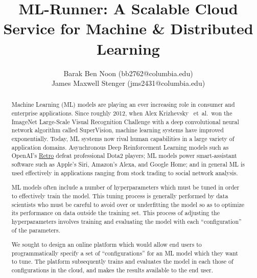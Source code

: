 \documentclass[12pt,oneside]{amsart}
\title{ML-Runner: A Scalable Cloud Service for Machine \& Distributed Learning} %
\author{
    Barak Ben Noon (bb2762@columbia.edu) \\
    James Maxwell Stenger (jms2431@columbia.edu)
}
\newcommand{\etal}{\mbox{ et al. }}
\begin{document}
\pagecolor{pagecolor}

\begin{abstract}
Machine Learning (ML) models are playing an ever increasing role in consumer and enterprise applications.
Since roughly 2012, when Alex Krizhevsky \etal won the ImageNet Large-Scale Visual Recognition Challenge with a deep convolutional neural network algorithm called SuperVision,
machine learning systems have improved exponentially.
Today, ML systems now rival human capabilities in a large variety of application domains.
Asynchronous Deep Reinforcement Learning models such as OpenAI's \href{https://github.com/openai/retro}{Retro} defeat professional Dota2 players;
ML models power smart-assistant software such as Apple's Siri, Amazon's Alexa, and Google Home;
and in general ML is used effectively in applications ranging from stock trading to social network analysis.

ML models often include a number of hyperparameters which must be tuned in order to effectively train the model.
This tuning process is generally performed by data scientists who must be careful to avoid over or underfitting the model so as to optimize its performance on data outside the training set.
This process of adjusting the hyperparameters involves training and evaluating the model with each ``configuration'' of the parameters.

We sought to design an online platform which would allow end users to programmatically specify a set of ``configurations'' for an ML model which they want to tune.
The platform subsequently trains and evaluates the model in each those of configurations in the cloud, and makes the results available to the end user.
\end{abstract}
\end{document}

